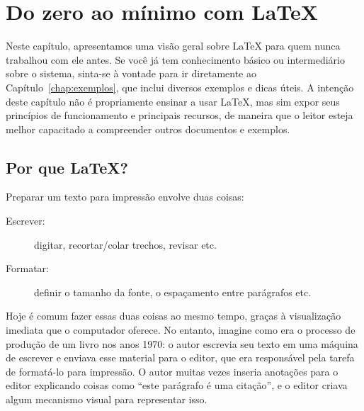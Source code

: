 

\newcommand{\sla}{\textbackslash}

\newcommand{\cmd}[1]{\textsf{#1}}

\newcommand{\texttt}[1]{\textsf{#1}}

\newcommand{\ltxcmd}[1]{\cmd{\sla{}#1}}

\chapter{Do zero ao mínimo com \LaTeX{}}
\label{chap:tutorial}

Neste capítulo, apresentamos uma visão geral sobre \LaTeX{} para quem
nunca trabalhou com ele antes. Se você já tem conhecimento básico ou
intermediário sobre o sistema, sinta-se à vontade para ir diretamente ao
Capítulo~\ref{chap:exemplos}, que inclui diversos exemplos e dicas úteis.
A intenção deste capítulo não é propriamente ensinar a usar \LaTeX{},
mas sim expor seus princípios de funcionamento e principais recursos,
de maneira que o leitor esteja melhor capacitado a compreender outros
documentos e exemplos.

\enlargethispage{-.5\baselineskip}

\section{Por que \LaTeX{}?}

Preparar um texto para impressão envolve duas coisas:

\begin{description}
\item[Escrever:] digitar, recortar/colar trechos, revisar etc.
\item[Formatar:] definir o tamanho da fonte, o
espaçamento entre parágrafos etc.
\end{description}

Hoje é comum fazer essas duas coisas ao mesmo tempo, graças à visualização
imediata que o computador oferece. No entanto, imagine como era o processo de
produção de um livro nos anos 1970: o autor escrevia seu texto em uma máquina
de escrever e enviava esse material para o editor, que era responsável pela
tarefa de formatá-lo para impressão. O autor muitas vezes inseria anotações
para o editor explicando coisas como ``este parágrafo é uma citação'', e o
editor criava algum mecanismo visual para representar isso.

